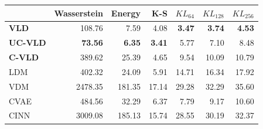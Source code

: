 \begin{tabular}{lrrrrrr}
\toprule
 & Wasserstein & Energy & K-S & $KL_{64}$ & $KL_{128}$ & $KL_{256}$ \\
\midrule
\textbf{VLD} & 108.76 & 7.59 & 4.08 & \textbf{3.47} & \textbf{3.74} & \textbf{4.53} \\
\textbf{UC-VLD} & \textbf{73.56} & \textbf{6.35} & \textbf{3.41} & 5.77 & 7.10 & 8.48 \\
\textbf{C-VLD} & 389.62 & 25.39 & 4.65 & 9.54 & 10.09 & 10.79 \\
LDM & 402.32 & 24.09 & 5.91 & 14.71 & 16.34 & 17.92 \\
VDM & 2478.35 & 181.35 & 17.14 & 29.28 & 32.29 & 35.60 \\
CVAE & 484.56 & 32.29 & 6.37 & 7.79 & 9.17 & 10.60 \\
CINN & 3009.08 & 185.13 & 15.74 & 28.55 & 30.19 & 32.37 \\
\bottomrule
\end{tabular}